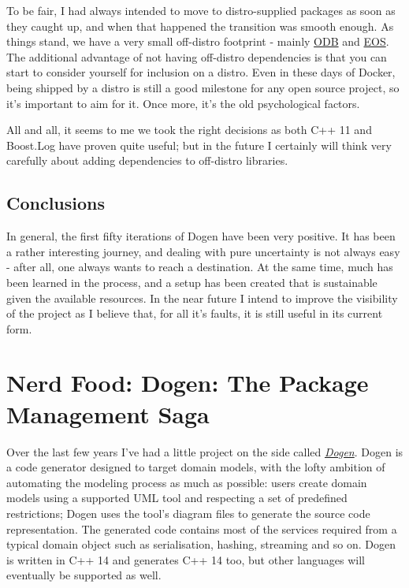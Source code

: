 \documentclass{book}
\begin{document}
To be fair, I had always intended to move to distro-supplied packages
as soon as they caught up, and when that happened the transition was
smooth enough. As things stand, we have a very small off-distro
footprint - mainly \href{http://www.codesynthesis.com/products/odb/}{ODB} and \href{http://epa.codeplex.com/}{EOS}. The additional advantage of not having
off-distro dependencies is that you can start to consider yourself for
inclusion on a distro. Even in these days of Docker, being shipped by
a distro is still a good milestone for any open source project, so it's
important to aim for it. Once more, it's the old psychological factors.

All and all, it seems to me we took the right decisions as both C++ 11
and Boost.Log have proven quite useful; but in the future I certainly
will think very carefully about adding dependencies to off-distro
libraries.

\section*{Conclusions}
\label{sec-6}

In general, the first fifty iterations of Dogen have been very
positive. It has been a rather interesting journey, and dealing with
pure uncertainty is not always easy - after all, one always wants to
reach a destination. At the same time, much has been learned in the
process, and a setup has been created that is sustainable given the
available resources. In the near future I intend to improve the
visibility of the project as I believe that, for all it's faults, it
is still useful in its current form.

\chapter{Nerd Food: Dogen: The Package Management Saga}

Over the last few years I've had a little project on the side called
\emph{\href{https://github.com/DomainDrivenConsulting/dogen}{Dogen}}. Dogen is a code generator designed to target domain models,
with the lofty ambition of automating the modeling process as much as
possible: users create domain models using a supported UML tool and
respecting a set of predefined restrictions; Dogen uses the tool’s
diagram files to generate the source code representation. The
generated code contains most of the services required from a typical
domain object such as serialisation, hashing, streaming and so on.
Dogen is written in C++ 14 and generates C++ 14 too, but other
languages will eventually be supported as well.
\end{document}
